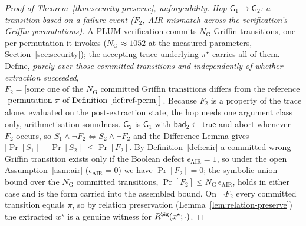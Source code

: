 \begin{proof}[Proof of Theorem~\ref{thm:security-preserve}, unforgeability]
    \smallskip\noindent\emph{Hop $\mathsf G_1\to\mathsf G_2$: a transition based on
a failure event ($F_2$, AIR mismatch across the verification's Griffin permutations).} A PLUM verification commits $N_{\mathrm G}$ Griffin transitions, one per permutation it invokes ($N_{\mathrm G}\approx 1052$ at the measured parameters, Section~\ref{sec:security}); the accepting trace underlying $\pi^\star$ carries all of them. Define, \emph{purely over those committed transitions and independently of whether extraction succeeded}, $F_2=\bigl[\text{some one of the $N_{\mathrm G}$ committed Griffin transitions differs from the reference}$ \\
$\text{ permutation }\pi\text{ of Definition~\ref{def:ref-perm}}\bigr]$. Because $F_2$ is a property of the trace alone, evaluated on the post-extraction state, the hop needs one argument class only, arithmetisation soundness. $\mathsf G_2$ is $\mathsf G_1$ with $\mathsf{bad}_2\leftarrow\mathsf{true}$ and abort whenever $F_2$ occurs, so $S_1\wedge\neg F_2\iff S_2\wedge\neg F_2$ and the Difference Lemma gives $|\Pr[S_1]-\Pr[S_2]|\le\Pr[F_2]$. By Definition~\ref{def:eair} a committed wrong Griffin transition exists only if the Boolean defect $\epsilon_{\mathrm{AIR}}=1$, so under the open Assumption~\ref{asm:air} ($\epsilon_{\mathrm{AIR}}=0$) we have $\Pr[F_2]=0$; the symbolic union bound over the $N_{\mathrm G}$ committed transitions, $\Pr[F_2]\le N_{\mathrm G}\,\epsilon_{\mathrm{AIR}}$, holds in either case and is the form carried into the assembled bound. On $\neg F_2$ every committed transition equals $\pi$, so by relation preservation (Lemma~\ref{lem:relation-preserve}) the extracted $w^\star$ is a genuine witness for $R^{\mathsf{Sig}}(x^\star;\cdot)$.


\end{proof}
